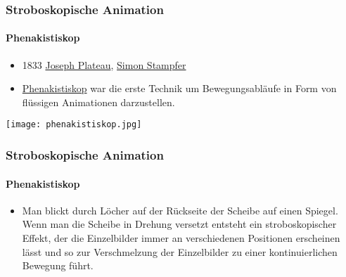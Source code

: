 \begin{frame}
    \frametitle{Stroboskopische Animation}
    \framesubtitle{Phenakistiskop}
    \begin{minipage}{0.5\textwidth}
        \begin{itemize}
            \item 1833 \href{https://de.wikipedia.org/wiki/Joseph_Antoine_Ferdinand_Plateau}{Joseph Plateau}, \href{https://de.wikipedia.org/wiki/Simon_Stampfer}{Simon Stampfer}
            \item \href{https://de.wikipedia.org/wiki/Phenakistiskop}{Phenakistiskop} war die erste Technik um Bewegungsabläufe in Form von flüssigen Animationen darzustellen.
        \end{itemize}
    \end{minipage} \hfill
    \begin{minipage}{0.45\textwidth}

        \texttt{[image: phenakistiskop.jpg]}
    \end{minipage}
\end{frame}

\begin{frame}
    \frametitle{Stroboskopische Animation}
    \framesubtitle{Phenakistiskop}
    \begin{minipage}{0.5\textwidth}
        \begin{itemize}
            \item Man blickt durch Löcher auf der Rückseite der Scheibe auf einen Spiegel. Wenn man die Scheibe in Drehung versetzt entsteht ein stroboskopischer Effekt, der die Einzelbilder immer an verschiedenen Positionen erscheinen lässt und so zur Verschmelzung der Einzelbilder zu einer kontinuierlichen Bewegung führt.
        \end{itemize}
    \end{minipage} \hfill
    \begin{minipage}{0.45\textwidth}

    \end{minipage}
\end{frame}

